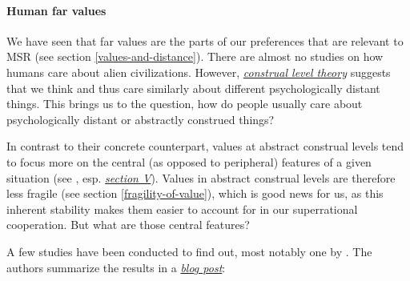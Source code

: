 \hypertarget{human-far-values}{\paragraph{Human far
values}\label{human-far-values}}

We have seen that far values are the parts of our preferences that are
relevant to MSR (see section
\ref{values-and-distance}). There are almost no studies on how humans care about
alien civilizations. However,
\href{https://en.wikipedia.org/wiki/Construal_level_theory}{\emph{construal
level theory}} suggests that we think and thus care similarly about
different psychologically distant things. This brings us to the
question, how do people usually care about psychologically distant or
abstractly construed things?

In contrast to their concrete counterpart, values at abstract construal
levels tend to focus more on the central (as opposed to peripheral)
features of a given situation (see \parencite{Trope2010-vo},
esp.
\href{http://www.psych.nyu.edu/trope/Trope_Liberman_2010.pdf\#page=12}{\emph{section
V}}). Values in abstract construal levels are therefore less fragile
(see section \ref{fragility-of-value}), which is good news for us, as this inherent stability makes
them easier to account for in our superrational cooperation. But what
are those central features?

A few studies have been conducted to find out, most notably one by
\parencite{Bain2013-fc}. The authors summarize the results
in a
\href{https://spsptalks.wordpress.com/2013/07/14/the-utopias-of-everyday-people/}{\emph{blog
post}}:

